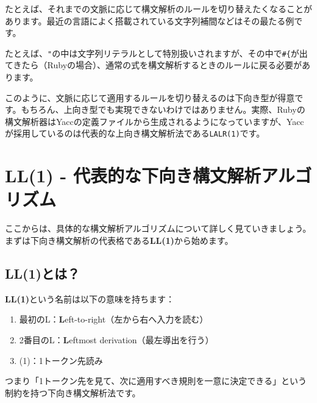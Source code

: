 たとえば、それまでの文脈に応じて構文解析のルールを切り替えたくなることがあります。最近の言語によく搭載されている文字列補間などはその最たる例です。

たとえば、\texttt{"}の中は文字列リテラルとして特別扱いされますが、その中で\texttt{\#\{}が出てきたら（Rubyの場合）、通常の式を構文解析するときのルールに戻る必要があります。

このように、文脈に応じて適用するルールを切り替えるのは下向き型が得意です。もちろん、上向き型でも実現できないわけではありません。実際、Rubyの構文解析器はYaccの定義ファイルから生成されるようになっていますが、Yaccが採用しているのは代表的な上向き構文解析法である\texttt{LALR(1)}です。

\hypertarget{chapter5-ll1---ux4ee3ux8868ux7684ux306aux4e0bux5411ux304dux69cbux6587ux89e3ux6790ux30a2ux30ebux30b4ux30eaux30baux30e0}{%
\section{LL(1) -
代表的な下向き構文解析アルゴリズム}\label{chapter5-ll1---ux4ee3ux8868ux7684ux306aux4e0bux5411ux304dux69cbux6587ux89e3ux6790ux30a2ux30ebux30b4ux30eaux30baux30e0}}

ここからは、具体的な構文解析アルゴリズムについて詳しく見ていきましょう。まずは下向き構文解析の代表格である\textbf{LL(1)}から始めます。

\hypertarget{chapter5-ll1ux3068ux306f}{%
\subsection{LL(1)とは？}\label{chapter5-ll1ux3068ux306f}}

\textbf{LL(1)}という名前は以下の意味を持ちます：

\begin{enumerate}
\def\labelenumi{\arabic{enumi}.}
\tightlist
\item
  最初のL：\textbf{L}eft-to-right（左から右へ入力を読む）
\item
  2番目のL：\textbf{L}eftmost derivation（最左導出を行う）
\item
  (1)：1トークン先読み
\end{enumerate}

つまり「1トークン先を見て、次に適用すべき規則を一意に決定できる」という制約を持つ下向き構文解析法です。

